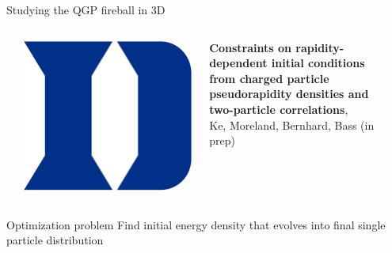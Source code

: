 \documentclass{beamer}
\begin{document}
\begin{frame}{Studying the QGP fireball in 3D}
  \bigskip
  \begin{columns}[T]
    \begin{column}{0.025\textwidth}
    \end{column}
    \begin{column}{0.05\textwidth}
      \raggedleft
      \includegraphics[width=\columnwidth]{duke}
    \end{column}
    \begin{column}{0.9\textwidth}
      \scriptsize {}
      \textbf{Constraints on rapidity-dependent initial conditions from charged particle pseudorapidity densities and two-particle correlations},\\
      Ke, Moreland, Bernhard, Bass (in prep)
    \end{column}
    \begin{column}{0.025\textwidth}
    \end{column}
  \end{columns}
  \vspace{-.5cm}
  \begin{columns}
    \begin{column}{.5\textwidth}
      \begin{block}{Optimization problem}
        \small
        Find initial energy density that evolves into final single particle distribution
      \end{block}

\end{column}
\end{columns}
\end{frame}
\end{document}
